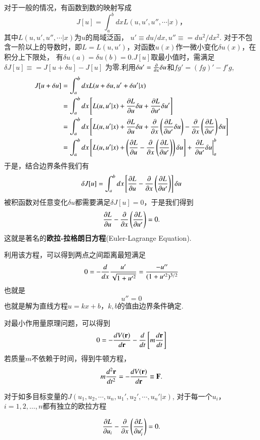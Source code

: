 对于一般的情况，有函数到数的映射写成
\begin{equation}
  J[u] = \int_{a}^{b}  dx L(u, u', u'', \cdots| x)， 
\end{equation}
其中$L(u, u', u'',\cdots | x)$为$u$的局域泛函， $u' \equiv du/dx, u'' \equiv = du^2/dx^2$.
对于不包含一阶以上的导数时，即$L = L(u,u')$，对函数$u(x)$作一微小变化$\delta u(x)$，在积分上下限处，
有$\delta u(a) = \delta u(b) = 0$.$J[u]$取最小值时，需满足$\delta J[u] \equiv = J[u + \delta u] - J[u]$
为零.利用$\delta u' = \frac{\partial{}}{\partial{x}} \delta u$和$fg' = (fg)' - f'g$,
\begin{align}
  J[u + \delta u] &= \int_{a}^{b}  dx L(u + \delta u, u' + \delta u'| x) 
    \nonumber \\ 
    &= \int_{a}^{b} dx \left[ L(u, u'| x) + \funcpd{L}{u} \delta u + \funcpd{L}{u'} \delta u' \right]  
    \nonumber \\ 
    &= \int_{a}^{b} dx \left[ L(u, u'| x) + \funcpd{L}{u} \delta u + \funcpd{}{x}\left( \funcpd{L}{u'} \delta u \right)
    -  \funcpd{}{x}\left( \funcpd{L}{u'} \right) \delta u  \right]  
    \nonumber \\ 
    &= \int_{a}^{b} dx \left[ L(u, u'| x) + \left( \funcpd{L}{u} -  \funcpd{}{x}\left( \funcpd{L}{u'} \right)   \right) \delta u \right]  
        + \left. \funcpd{L}{u'} \delta u \right|_{a}^{b} 
     \nonumber %
\end{align}
于是，结合边界条件我们有
\begin{align}
  \delta J[u] = \int_{a}^{b} dx \left[ \frac{\partial{L}}{\partial{u}} -  \frac{\partial{}}{\partial{x}}\left( \frac{\partial{L}}{\partial{u'}} \right)   \right] \delta u 
\end{align}
被积函数对任意变化$\delta u$都需要满足$\delta J[u] = 0$，于是我们得到
\begin{equation}
  \frac{\partial{L}}{\partial{u}} -  \frac{\partial{}}{\partial{x}}\left( \frac{\partial{L}}{\partial{u'}} \right) = 0 .
\end{equation}
这就是著名的\textbf{欧拉-拉格朗日方程}(Euler-Lagrange Equation).

利用该方程，可以得到两点之间距离最短满足
\[
  0 = - \frac{d{}}{d{x}} \frac{u'}{\sqrt{1 + u'^2}} = \frac{-u''}{(1+ u'^2)^{3/2}}
\]
也就是
\[ u'' = 0\]
也就是解为直线方程$ u = k x + b$，$k,b$的值由边界条件确定.

对最小作用量原理问题，可以得到
\[
  0 = - \frac{d{V({\mathbf{r}})}}{d{{\mathbf{r}}}} - \frac{d{}}{d{t}} \left[ m \frac{d{\mathbf{r}}}{dt} \right]
\]
若质量$m$不依赖于时间，得到牛顿方程，
\[
  m \frac{d^2{\mathbf{r}}}{dt^2} = - \frac{d{V({\mathbf{r}})}}{d{{\mathbf{r}}}} \equiv {\mathbf{F}} .
\]

对于如多目标变量的$J(u_1, u_2, \cdots, u_n, u_1', u_2', \cdots, u_n'|x)$, 对于每一个$u_i$， $i=1,2,\dots,n$都有独立的欧拉方程

\begin{equation}
  \frac{\partial{L}}{\partial{u_i}} -  \frac{\partial{}}{\partial{x}}\left( \frac{\partial{L}}{\partial{u'_i}} \right) = 0 .
\end{equation}





